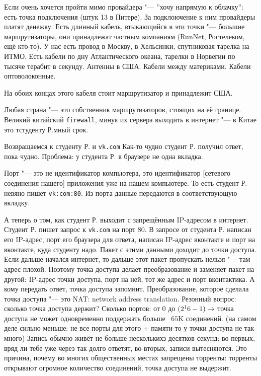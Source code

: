 Если очень хочется пройти мимо провайдера "--- ''хочу напрямую к облачку'': 
есть точка подключения (штук 13 в Питере). 
За подклоючение к ним провайдеры платят денежку.
Есть длинный кабель, втыкающийся в эти точки "--- большие маршрутизаторы, 
они принадлежат частным компаниям (RunNet, Ростелеком, ещё кто-то).
У нас есть провод в Москву, в Хельсинки, спутниковая тарелка на ИТМО. 
Есть кабели по дну Атлантического океана, тарелки в Норвегии по тысяче терабит в секунду.
Антенны в США.
Кабели между материками.
Кабели оптоволоконные.

На обоих концах этого кабеля стоит маршрутизатор и принадлежит США.

Любая страна "--- это собственник маршрутизаторов, стоящих на её границе.
Великий китайский \texttt{firewall}, минуя их сервера выходить в интернет "--- в Китае это тстуденту Р.мный срок.



Возвращаемся к студенту Р. и \texttt{vk.com}
Как-то чудно студент Р. получил ответ, пока чудно.
Проблема: у студента Р. в браузере не одна вкладка.

Порт "--- это не идентификатор компьютера, это идентификатор [сетевого соединения нашего] приложения уже на нашем компьютере.
То есть студент Р. невяно пишет \texttt{vk:com:80}.
Из порта данные передаются в соответствующую вкладку.


А теперь о том, как студент Р. выходит с запрещённым IP-адресом в интернет.
Студент Р. пишет запрос к \texttt{vk.com} на порт 80. 
В запросе от студента Р. написан его IP-адрес, порт его браузера для ответа, написан IP-адрес вконтакте и порт на вконтакте, 
куда студенту надо.
Пакет с этими данными доходит до точки доступа. 
Если дальше начался интернет, то дальше этот пакет пропускать нельзя "--- там адрес плохой.
Поэтому точка доступа делает преобразование и заменяет пакет на другой: 
IP-адрес точки доступа, порт на ней, тот же адрес и порт вконтактика.
А кому передать ответ, точка доступа запомнит.
Преобразование, которое сделала точка доступа "--- это NAT: network address translation.
Резонный вопрос: сколько точка доступа держит?
Сколько портов: от $0$ до $(2^16 - 1) \rightarrow$ точка доступа не может одновременно поддержать больше ~$65$K соединений.
(на самом деле сильно меньше: не все порты для этого + памяти-то у точки доступа не так много)
Запись обычно живёт не больше несколькихз десятков секунд: 
во-первых, вряд ли тебе уже через так долго ответят, 
во-вторых, записи вытесняются.
Это причина, почему во многих общественных местах запрещены торренты: 
торренты открывают огромное количество соединений, точка доступа не выдержит. %

